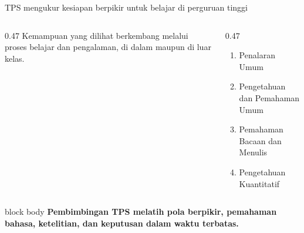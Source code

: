 \begin{frame}{TPS mengukur kesiapan berpikir untuk belajar di perguruan tinggi}
  \begin{columns}[T,onlytextwidth]
    \begin{column}{0.47\textwidth}
      \vspace{0.22cm}
      {\fontsize{12}{15}\selectfont Kemampuan yang dilihat berkembang melalui proses belajar dan pengalaman, di dalam maupun di luar kelas.}
    \end{column}
    \begin{column}{0.47\textwidth}
      \begin{enumerate}
        \item Penalaran Umum
        \item Pengetahuan dan Pemahaman Umum
        \item Pemahaman Bacaan dan Menulis
        \item Pengetahuan Kuantitatif
      \end{enumerate}
    \end{column}
  \end{columns}
  \vspace{0.18cm}
  \begin{beamercolorbox}[rounded=true,sep=0.17cm,wd=\textwidth]{block body}
    \centering\bfseries Pembimbingan TPS melatih pola berpikir, pemahaman bahasa, ketelitian, dan keputusan dalam waktu terbatas.
  \end{beamercolorbox}
\end{frame}

